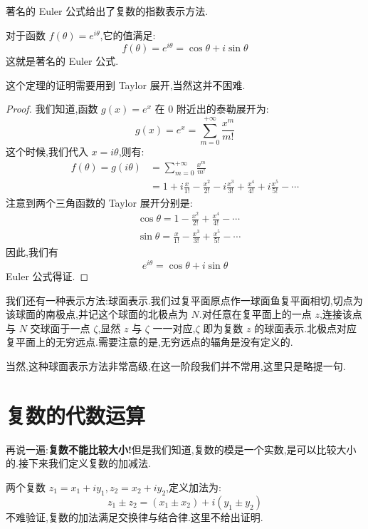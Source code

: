 \documentclass[UTF8]{ctexbook}
\begin{document}
著名的 Euler 公式给出了复数的指数表示方法.
\begin{theorem}[Euler 公式]
    对于函数 $f(\theta)=e^{i\theta}$,它的值满足:
    \begin{equation}
        f(\theta) = e^{i\theta} = \cos \theta + i\sin \theta
    \end{equation}
    这就是著名的 Euler 公式.
\end{theorem}

这个定理的证明需要用到 Taylor 展开,当然这并不困难.
\begin{proof}
    我们知道,函数 $g(x) = e^x$ 在 0 附近出的泰勒展开为:
    \[
    g(x) = e^x = \sum _{m=0}^{+\infty} \frac{x^m}{m!}
    \]
    这个时候,我们代入 $x=i\theta$,则有:
    \begin{align*}
        f(\theta) = g(i\theta) &= \sum_{m=0}^{+\infty}\frac{x^m}{m^!} \\
        &= 1 + i\frac{x}{1!} - \frac{x^2}{2!} -i\frac{x^3}{3!} +\frac{x^4}{4!} +i\frac{x^5}{5!} -\cdots
    \end{align*}
    注意到两个三角函数的 Taylor 展开分别是:
    \begin{align*}
        &\cos\theta = 1 - \frac{x^2}{2!} + \frac{x^4}{4!} -\cdots \\
        &\sin\theta = \frac{x}{1!} - \frac{x^3}{3!} + \frac{x^5}{5!} -\cdots
    \end{align*}
    因此,我们有
    \[
    e^{i\theta} = \cos\theta + i\sin\theta
    \]
    Euler 公式得证.
\end{proof}

我们还有一种表示方法:球面表示.我们过复平面原点作一球面鱼复平面相切,切点为该球面的南极点,并记这个球面的北极点为 $N$.对任意在复平面上的一点 $z$,连接该点与 $N$ 交球面于一点 $\zeta$,显然 $z$ 与 $\zeta$ 一一对应,$\zeta$ 即为复数 $z$ 的球面表示.北极点对应复平面上的无穷远点.需要注意的是,无穷远点的辐角是没有定义的.

当然,这种球面表示方法非常高级,在这一阶段我们并不常用,这里只是略提一句.

\section{复数的代数运算}

再说一遍:\textbf{复数不能比较大小!}但是我们知道,复数的模是一个实数,是可以比较大小的.接下来我们定义复数的加减法.

\begin{definition}
    两个复数 $z_1=x_1+iy_1,z_2=x_2+iy_2$,定义加法为:
    \begin{equation}
        z_1\pm z_2=(x_1\pm x_2) + i(y_1\pm y_2)
    \end{equation}
    不难验证,复数的加法满足交换律与结合律.这里不给出证明.
\end{definition}
\end{document}
